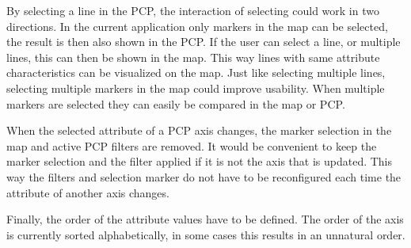 By selecting a line in the PCP, the interaction of selecting could work in two directions.
In the current application only markers in the map can be selected, the result is then also shown in the PCP.
If the user can select a line, or multiple lines, this can then be shown in the map.
This way lines with same attribute characteristics can be visualized on the map.
Just like selecting multiple lines, selecting multiple markers in the map could improve usability.
When multiple markers are selected they can easily be compared in the map or PCP.

When the selected attribute of a PCP axis changes, the marker selection in the map and active PCP filters are removed.
It would be convenient to keep the marker selection and the filter applied if it is not the axis that is updated.
This way the filters and selection marker do not have to be reconfigured each time the attribute of another axis changes.

Finally, the order of the attribute values have to be defined.
The order of the axis is currently sorted alphabetically, in some cases this results in an unnatural order.